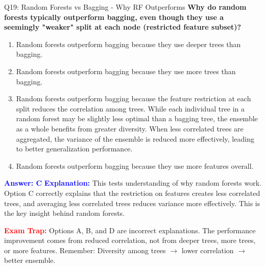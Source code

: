 \documentclass[8pt]{beamer}
\begin{document}
	\begin{frame}{Q19: Random Forests vs Bagging - Why RF Outperforms}
		\fontsize{6.5}{7.5}\selectfont
		\textbf{Why do random forests typically outperform bagging, even though they use a seemingly "weaker" split at each node (restricted feature subset)?}
		
		\begin{enumerate}
			\item Random forests outperform bagging because they use deeper trees than bagging.
			\item Random forests outperform bagging because they use more trees than bagging.
			\item Random forests outperform bagging because the feature restriction at each split reduces the correlation among trees. While each individual tree in a random forest may be slightly less optimal than a bagging tree, the ensemble as a whole benefits from greater diversity. When less correlated trees are aggregated, the variance of the ensemble is reduced more effectively, leading to better generalization performance.
			\item Random forests outperform bagging because they use more features overall.
		\end{enumerate}
		
		\vspace{0.1cm}
		\textcolor{blue}{\textbf{Answer: C}}
		\vspace{0.1cm}
		\textcolor{blue}{\textbf{Explanation:}} This tests understanding of why random forests work. Option C correctly explains that the restriction on features creates less correlated trees, and averaging less correlated trees reduces variance more effectively. This is the key insight behind random forests.
		
		\textcolor{red}{\textbf{Exam Trap:}} Options A, B, and D are incorrect explanations. The performance improvement comes from reduced correlation, not from deeper trees, more trees, or more features. Remember: Diversity among trees $\rightarrow$ lower correlation $\rightarrow$ better ensemble.
	\end{frame}
	
\end{document}
